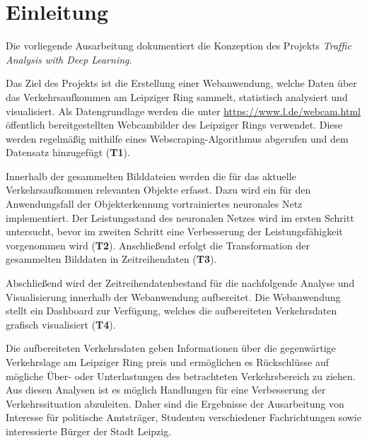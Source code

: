 \newpage
\section{Einleitung}

Die vorliegende Ausarbeitung dokumentiert die Konzeption des Projekts \textit{Traffic Analysis with Deep Learning}.

Das Ziel des Projekts ist die Erstellung einer Webanwendung, welche Daten über das 
Verkehrsaufkommen am Leipziger Ring sammelt, statistisch analysiert und visualisiert.
Als Datengrundlage werden die unter \url{https://www.l.de/webcam.html} öffentlich bereitgestellten Webcambilder
des Leipziger Rings verwendet. 
Diese werden regelmäßig mithilfe eines Webscraping-Algorithmus abgerufen und dem Datensatz hinzugefügt (\textbf{T1}). 

Innerhalb der gesammelten Bilddateien werden die für das aktuelle Verkehrsaufkommen relevanten Objekte erfasst.
Dazu wird ein für den Anwendungsfall der Objekterkennung vortrainiertes neuronales Netz implementiert.
Der Leistungsstand des neuronalen Netzes wird im ersten Schritt untersucht, bevor im zweiten Schritt eine
Verbesserung der Leistungsfähigkeit vorgenommen wird (\textbf{T2}). 
Anschließend erfolgt die Transformation der gesammelten Bilddaten in Zeitreihendaten (\textbf{T3}). 

Abschließend wird der Zeitreihendatenbestand für die nachfolgende Analyse und Visualisierung innerhalb der 
Webanwendung aufbereitet. 
Die Webanwendung stellt ein Dashboard zur Verfügung, welches die aufbereiteten Verkehrsdaten grafisch 
visualisiert (\textbf{T4}). 

Die aufbereiteten Verkehrsdaten geben Informationen über die gegenwärtige Verkehrslage am Leipziger Ring preis 
und ermöglichen es Rückschlüsse auf mögliche Über- oder Unterlastungen des betrachteten Verkehrsbereich zu ziehen.
Aus diesen Analysen ist es möglich Handlungen für eine Verbesserung der Verkehrssituation abzuleiten.  
Daher sind die Ergebnisse der Ausarbeitung von Interesse für politische Amtsträger, Studenten verschiedener 
Fachrichtungen sowie interessierte Bürger der Stadt Leipzig.